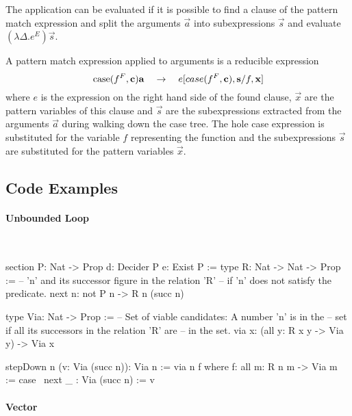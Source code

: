 The application can be evaluated if it is possible to find a clause of the
pattern match expression and split the arguments $\vec a$ into subexpressions
$\vec s$ and evaluate $(\lambda \Delta. e^E) \vec s$.

A pattern match expression applied to arguments is a reducible expression
$$
{\text{case}}(f^F, {\mathbf c}) {\mathbf a} \quad\to\quad e[case(f^F, {\mathbf c}), {\mathbf s} / f, {\mathbf x}]
$$
where $e$ is the expression on the right hand side of the found clause, $\vec x$
are the pattern variables of this clause and $\vec s$ are the subexpressions
extracted from the arguments $\vec a$ during walking down the case tree. The
hole case expression is substituted for the variable $f$ representing the
function and the subexpressions $\vec s$ are substituted for the pattern
variables $\vec x$.



\subsection{Code Examples}



\paragraph{Unbounded Loop}

\ \begin{alba}
    section
        P: Nat -> Prop
        d: Decider P
        e: Exist P
    :=
        type R: Nat -> Nat -> Prop :=
                -- 'n' and its successor figure in the relation 'R'
                -- if 'n' does not satisfy the predicate.
            next {n}: not P n -> R n (succ n)

        type Via: Nat -> Prop :=
                -- Set of viable candidates: A number 'n' is in the
                -- set if all its successors in the relation 'R' are
                -- in the set.
            via {x}: (all {y}: R x y -> Via y) -> Via x

        stepDown {n} (v: Via (succ n)): Via n :=
            via {n} f where
                f: all {m}: R n m -> Via m
                := case
                    \ next _ : Via (succ n) := v
\end{alba}


\paragraph{Vector}

